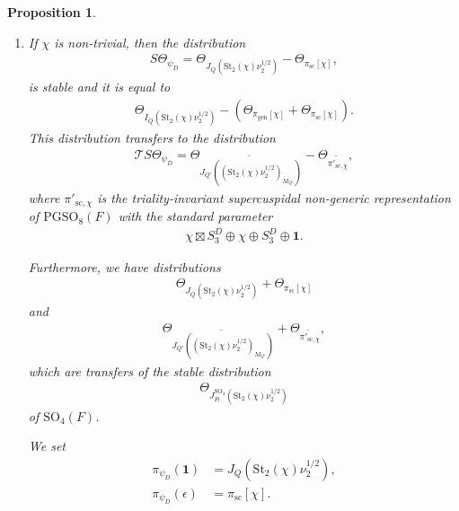 \documentclass[12pt]{amsart}
\theoremstyle{definition}
\theoremstyle{plain}
\newtheorem{proposition}[definition]{Proposition}
\theoremstyle{remark}
\def\GL{\mathrm{GL}}
\def\SO{\mathrm{SO}}
\def\PGSO{\mathrm{PGSO}}
\newcommand{\cT}{\mathcal{T}}
\numberwithin{equation}{section}
\newcommand{\gen}{\mathrm{gen}}
\newcommand{\St}{\mathrm{St}}
\begin{document}
\begin{proposition}
\begin{enumerate}
            We set 
            \begin{align*}
                  \pi_{\psi_D}(\mathbf{1}) &= J_Q(\St_{\GL_2} \nu_2^{1/2}), \\
                  \pi_{\psi_D}(\epsilon) &= \pi_{\deg}[1] \oplus \pi_{\mathrm{sc}}[1].
            \end{align*}

            \item 
            If $\chi$ is non-trivial, then the distribution
            \begin{align*}
                  S\Theta_{\psi_D} = 
                  \Theta_{J_Q(\St_{2}(\chi) \nu_2^{1/2})} - \Theta_{\pi_{\mathrm{sc}}[\chi]},
            \end{align*}
            is stable and it is equal to
            \begin{align*}
                  \Theta_{I_Q(\St_{2}(\chi) \nu_2^{1/2})} - (\Theta_{\pi_{\gen}[\chi]} + \Theta_{\pi_{\mathrm{sc}}[\chi]}).
            \end{align*}
            This distribution transfers to the distribution
            \begin{align*}
                  \cT S\Theta_{\psi_D} =
                  \Theta_{\widetilde{J_{Q'}((\St_{2}(\chi) \nu_2^{1/2})_{M_{Q'}})}} - \Theta_{\widetilde{\pi'_{\mathrm{sc}, \chi}}},
            \end{align*}
            where $\pi'_{\mathrm{sc}, \chi}$ is the triality-invariant supercuspidal non-generic representation of $\PGSO_8(F)$ with the standard parameter
            \begin{align*}
                  \chi \boxtimes S_3^D \oplus \chi \oplus S_3^D \oplus \mathbf{1}.
            \end{align*}

            Furthermore, we have distributions
            \begin{align*}
                  \Theta_{J_Q(\St_{2}(\chi) \nu_2^{1/2})} + \Theta_{\pi_{\mathrm{sc}}[\chi]}
            \end{align*}
            and
            \begin{align*}
                  \Theta_{\widetilde{J_{Q'}((\St_{2}(\chi) \nu_2^{1/2})_{M_{Q'}})}} + \Theta_{\widetilde{\pi'_{\mathrm{sc}, \chi}}},
            \end{align*}
            which are transfers of the stable distribution
            \begin{align*}
                  \Theta_{J_{P_{l}}^{\SO_4}(\St_{2}(\chi) \nu_2^{1/2})}
            \end{align*}
            of $\SO_4(F)$.

            We set 
            \begin{align*}
                  \pi_{\psi_D}(\mathbf{1}) &= J_Q(\St_{2}(\chi) \nu_2^{1/2}), \\
                  \pi_{\psi_D}(\epsilon) &= \pi_{\mathrm{sc}}[\chi].
            \end{align*}
      \end{enumerate}
\end{proposition}
\end{document}
